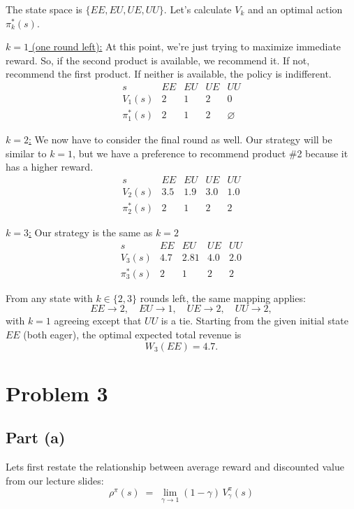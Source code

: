 \documentclass[12pt]{article}
\begin{document}
\medskip
\noindent{} The state space is $\{EE,EU,UE,UU\}$.
Let's calculate $V_k$ and an optimal action $\pi_k^\ast(s)$.

\medskip
\noindent\underline{$k=1$ (one round left):}
At this point, we're just trying to maximize immediate reward. So, if the second product is available,
we recommend it. If not, recommend the first product. If neither is available, the policy is indifferent.
\[
		\begin{array}{c|cccc}
				s & EE & EU & UE & UU\\\hline
				V_1(s) & 2 & 1 & 2 & 0\\
				\pi_1^\ast(s) & 2 & 1 & 2 & \varnothing
		\end{array}
\]

\medskip
\noindent\underline{$k=2$:}
We now have to consider the final round as well. Our strategy will be similar to $k=1$, but we have a
preference to recommend product \#2 because it has a higher reward.
\[
		\begin{array}{c|cccc}
				s & EE & EU & UE & UU\\\hline
				V_2(s) & 3.5 & 1.9 & 3.0 & 1.0\\
				\pi_2^\ast(s) & 2 & 1 & 2 & 2
		\end{array}
\]

\medskip
\noindent\underline{$k=3$:}
Our strategy is the same as $k=2$
\[
		\begin{array}{c|cccc}
				s & EE & EU & UE & UU\\\hline
				V_3(s) & 4.7 & 2.81 & 4.0 & 2.0 \\
				\pi_3^\ast(s) & 2 & 1 & 2 & 2
		\end{array}
\]

\medskip
\noindent{}
From any state with $k\in\{2,3\}$ rounds left, the same mapping applies:
\[
		EE\to 2,\quad EU\to 1,\quad UE\to 2,\quad UU\to 2,
\]
with $k=1$ agreeing except that $UU$ is a tie. Starting from the given initial state $EE$ (both eager), the optimal expected total revenue is
\[
		W_3(EE)=\boxed{4.7}.
\]
\newpage
\section*{Problem 3}
\subsection*{Part (a)}
Lets first restate the relationship between average reward and discounted value from our lecture slides:
$$		\rho^\pi(s)\;=\;\lim_{\gamma\to 1}(1-\gamma)\,V^\pi_\gamma(s)$$
\end{document}
